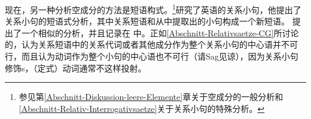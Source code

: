 %
现在，另一种分析空成分的方法是短语构式。\footnote{%
参见第\ref{Abschnitt-Diskussion-leere-Elemente}章关于空成分的一般分析和\ref{Abschnitt-Relativ-Interrogativsaetze}关于关系小句的特殊分析。
}\cite{Sag97a}研究了英语的关系小句，他提出了关系小句的短语式分析，其中关系短语和从中提取出的小句构成一个新短语。 \citet{Babel}提出了一个相似的分析，并且记录在 中。正如\ref{Abschnitt-Relativsaetze-CG}所讨论的，认为关系短语中的关系代词或者其他成分作为整个关系小句的中心语并不可行，而且认为动词作为整个小句的中心语也不可行（请Sag见谅），因为关系小句修饰\nbar{}s，（定式）动词通常不这样投射。
